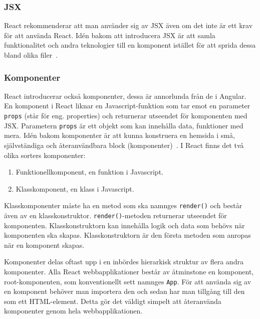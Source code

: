 \subsubsection{JSX}
React rekommenderar att man använder sig av JSX även om det inte är ett krav för att använda React. Idén bakom att introducera JSX är att samla funktionalitet och andra teknologier till en komponent istället för att sprida dessa bland olika filer~\cite{react-jsx}.


\subsubsection{Komponenter}
React introducerar också komponenter, dessa är annorlunda från de i Angular. En komponent i React liknar en Javascript-funktion som tar emot en parameter \texttt{props} (står för eng. properties) och returnerar utseendet för komponenten med JSX. Parametern \texttt{props} är ett objekt som kan innehålla data, funktioner med mera. Idén bakom komponenter är att kunna konstruera en hemsida i små, självständiga och återanvändbara block (komponenter)~\cite{react-components}. I React finns det två olika sorters komponenter:
\\
\begin{enumerate}
    \item Funktionellkomponent, en funktion i Javascript.
    \item Klasskomponent, en klass i Javascript.
\end{enumerate}

Klasskomponenter måste ha en metod som ska namnges \texttt{render()} och består även av en klasskonstruktor. \texttt{render()}-metoden returnerar utseendet för komponenten. Klasskonstruktorn kan innehålla logik och data som behövs när komponenten ska skapas. Klasskonstruktorn är den första metoden som anropas när en komponent skapas.

Komponenter delas oftast upp i en inbördes hierarkisk struktur av flera andra komponenter. Alla React webbapplikationer består av åtminstone en komponent, root-komponenten, som konventionellt sett namnges \texttt{App}. För att använda sig av en komponent behöver man importera den och sedan har man tillgång till den som ett HTML-element. Detta gör det väldigt simpelt att återanvända komponenter genom hela webbapplikationen.



